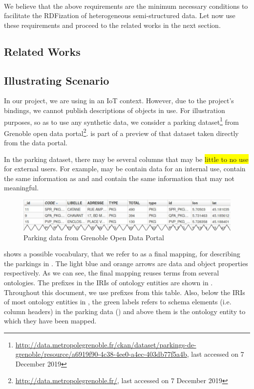 \paragraph{}We believe that the above requirements are the minimum necessary conditions to facilitate the RDFization of heterogeneous semi-structured data. Let now use these requirements and proceed to the related works in the next section. 

\subsection{Related Works}\label{sec:relatedWork}


\subsection{Illustrating Scenario}\label{sec:illustratingScenario}
In our project, we are using \thingin in an IoT context. However, due to the project's bindings, we cannot publish descriptions of objects in use. For illustration purposes, so as to use any synthetic data, we consider a parking dataset\footnote{\url{http://data.metropolegrenoble.fr/ckan/dataset/parkings-de-grenoble/resource/a6919f90-4c38-4ee0-a4ec-403db77f5a4b}, last accessed on 7 December 2019} from Grenoble open data portal\footnote{\url{http://data.metropolegrenoble.fr/}, last accessed on 7 December 2019}.  is part of a preview of that dataset taken directly from the data portal.

In the parking dataset, there may be several columns that may be \colorbox{yellow}{little to no use} for external users. For example,  may be contain data for an internal use,  contain the same information as  and  and  contain the same information that may not meaningful.

\begin{figure}[h]
	\centering
	\includegraphics[scale=0.45]{images/sampleRawData.pdf}
	\caption{Parking data from Grenoble Open Data Portal}
	\label{fig:sampleRawData}
\end{figure}

 shows a possible vocabulary, that we refer to as a final mapping, for describing the parkings in . The light blue and orange arrows are data and object properties respectively. As we can see, the final mapping reuses terms from several ontologies. The prefixes in the IRIs of ontology entities are shown in . Throughout this document, we use prefixes from this table. Also, below the IRIs of most ontology entities in , the green labels refers to schema elements (i.e. column headers) in the parking data (\cf {}) and above them is the ontology entity to which they have been mapped.

